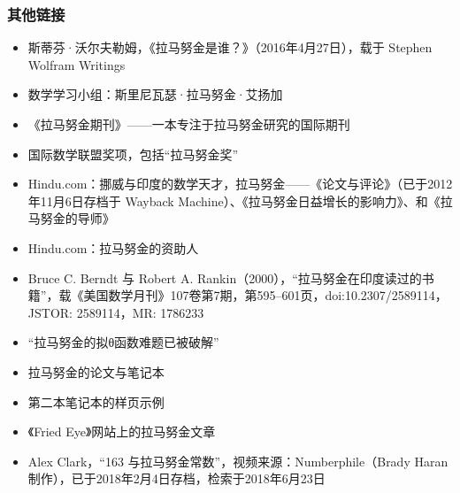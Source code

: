 \subsubsection{其他链接}
\begin{itemize}
\item 斯蒂芬·沃尔夫勒姆，《拉马努金是谁？》（2016年4月27日），载于 Stephen Wolfram Writings
\item 数学学习小组：斯里尼瓦瑟·拉马努金·艾扬加
\item 《拉马努金期刊》——一本专注于拉马努金研究的国际期刊
\item 国际数学联盟奖项，包括“拉马努金奖”
\item Hindu.com：挪威与印度的数学天才，拉马努金——《论文与评论》（已于2012年11月6日存档于 Wayback Machine）、《拉马努金日益增长的影响力》、和《拉马努金的导师》
\item Hindu.com：拉马努金的资助人
\item Bruce C. Berndt 与 Robert A. Rankin（2000），“拉马努金在印度读过的书籍”，载《美国数学月刊》107卷第7期，第595–601页，doi:10.2307/2589114，JSTOR: 2589114，MR: 1786233
\item “拉马努金的拟θ函数难题已被破解”
\item 拉马努金的论文与笔记本
\item 第二本笔记本的样页示例
\item 《Fried Eye》网站上的拉马努金文章
\item Alex Clark，“163 与拉马努金常数”，视频来源：Numberphile（Brady Haran制作），已于2018年2月4日存档，检索于2018年6月23日
\end{itemize}